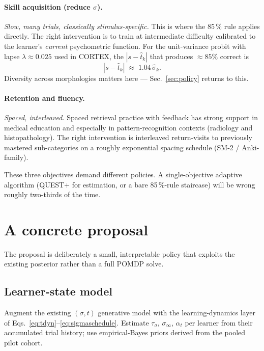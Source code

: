 \documentclass[11pt]{article}
\begin{document}
\paragraph{Skill acquisition (reduce $\sigma$).}
\textit{Slow, many trials, classically stimulus-specific.} This is
where the 85\,\% rule applies directly. The right intervention is to
train at intermediate difficulty calibrated to the learner's
\emph{current} psychometric function. For the unit-variance probit
with lapse $\lambda \approx 0.025$ used in CORTEX, the $|s-\hat t_k|$
that produces $\approx 85\%$ correct is
\begin{equation}
  |s - \hat t_k| \;\approx\; 1.04\,\hat\sigma_k.
  \label{eq:eightyfive}
\end{equation}
Diversity across morphologies matters here — Sec.~\ref{sec:policy}
returns to this.

\paragraph{Retention and fluency.}
\textit{Spaced, interleaved.} Spaced retrieval practice with feedback
has strong support in medical education \citep{carpenter2022spacing}
and especially in pattern-recognition contexts (radiology and
histopathology). The right intervention is interleaved return-visits
to previously mastered sub-categories on a roughly exponential spacing
schedule (SM-2 / Anki-family).

These three objectives demand different policies. A single-objective
adaptive algorithm (QUEST$+$ for estimation, or a bare 85\,\%-rule
staircase) will be wrong roughly two-thirds of the time.

\section{A concrete proposal}
\label{sec:proposal}

The proposal is deliberately a small, interpretable policy that
exploits the existing posterior rather than a full POMDP solve.

\subsection{Learner-state model}
Augment the existing $(\sigma,t)$ generative model with the
learning-dynamics layer of Eqs.~\eqref{eq:tdyn}--\eqref{eq:sigmaschedule}.
Estimate $\tau_\sigma$, $\sigma_\infty$, $\alpha_t$ per learner from
their accumulated trial history; use empirical-Bayes priors derived
from the pooled pilot cohort.
\end{document}
